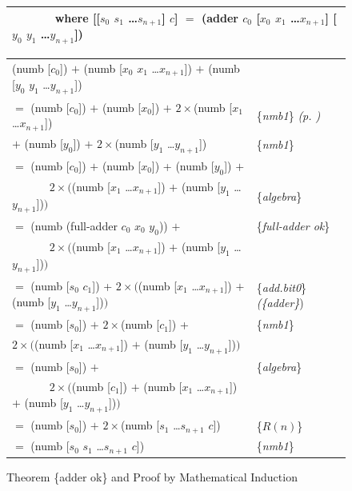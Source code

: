 \begin{figure}
\begin{center}
\begin{tabular}{l}
 ~~~~~~ where [[$s_0$ $s_1$ \dots $s_{n+1}$] $c$] $=$ (adder $c_0$ [$x_0$ $x_1$ \dots $x_{n+1}$] [$y_0$ $y_1$ \dots $y_{n+1}$]) \\
\hline
\end{tabular}
\begin{tabular}{ll}
(numb [$c_0$]) $+$ (numb [$x_0$ $x_1$ \dots $x_{n+1}$]) $+$ (numb [$y_0$ $y_1$ \dots $y_{n+1}$])          & \\
$=$ (numb [$c_0$]) $+$ (numb [$x_0$]) $+$ $2\times$(numb [$x_1$ \dots $x_{n+1}$])                         & \{\emph{nmb1}\} \emph{(p. \pageref{nmb1})} \\
\hphantom{$=$ (numb [$c_0$]) }$+$ (numb [$y_0$]) $+$ $2\times$(numb [$y_1$ \dots $y_{n+1}$])                  & \{\emph{nmb1}\} \\
$=$ (numb [$c_0$]) $+$ (numb [$x_0$]) + (numb [$y_0$]) $+$                                                & \\
 ~~~~~~ $2\times($(numb [$x_1$ \dots $x_{n+1}$]) $+$ (numb [$y_1$ \dots $y_{n+1}$])$)$                    & \{\emph{algebra}\} \\
$=$ (numb (full-adder $c_0$ $x_0$ $y_0$)) $+$                                                             & \{\emph{full-adder ok}\} \\
 ~~~~~~ $2\times($(numb [$x_1$ \dots $x_{n+1}$]) $+$ (numb [$y_1$ \dots $y_{n+1}$])$)$                    & \\
$=$ (numb [$s_0$ $c_1$]) + $2\times($(numb [$x_1$ \dots $x_{n+1}$]) $+$ (numb [$y_1$ \dots $y_{n+1}$])$)$ & \{\emph{add.bit0}\} \emph{(\{adder\}}) \\
$=$ (numb [$s_0$]) $+$ $2\times$(numb [$c_1$]) +                                                          & \{\emph{nmb1}\} \\
\hphantom{$=$ (numb [$s_0$ $c_1$]) + }$2\times($(numb [$x_1$ \dots $x_{n+1}$]) $+$ (numb [$y_1$ \dots $y_{n+1}$])$)$  & \\
$=$ (numb [$s_0$]) $+$                                                                                    & \{\emph{algebra}\} \\
 ~~~~~~ $2\times($(numb [$c_1$]) $+$ (numb [$x_1$ \dots $x_{n+1}$]) $+$ (numb [$y_1$ \dots $y_{n+1}$])$)$ & \\
$=$ (numb [$s_0$]) $+$ $2\times$(numb [$s_1$ \dots $s_{n+1}$ $c$])                                        & \{$R(n)$\} \\
$=$ (numb [$s_0$ $s_1$ \dots $s_{n+1}$ $c$])                                                              & \{\emph{nmb1}\} \\
\end{tabular}
\end{center}
\caption{Theorem \{adder ok\} and Proof by Mathematical Induction}
\label{fig:adder-thm-prf}
\end{figure}

